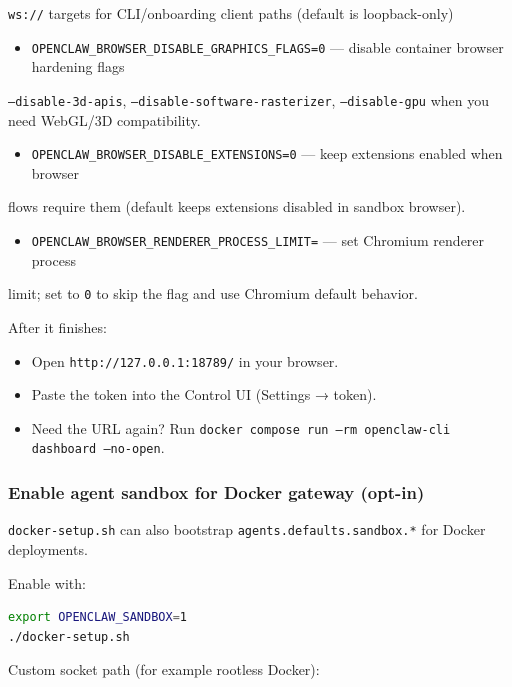 \texttt{ws://} targets for CLI/onboarding client paths (default is loopback-only)
\begin{itemize}
  \item \texttt{OPENCLAW\_BROWSER\_DISABLE\_GRAPHICS\_FLAGS=0} — disable container browser hardening flags
\end{itemize}

\texttt{--disable-3d-apis}, \texttt{--disable-software-rasterizer}, \texttt{--disable-gpu} when you need
WebGL/3D compatibility.
\begin{itemize}
  \item \texttt{OPENCLAW\_BROWSER\_DISABLE\_EXTENSIONS=0} — keep extensions enabled when browser
\end{itemize}

flows require them (default keeps extensions disabled in sandbox browser).
\begin{itemize}
  \item \texttt{OPENCLAW\_BROWSER\_RENDERER\_PROCESS\_LIMIT=} — set Chromium renderer process
\end{itemize}

limit; set to \texttt{0} to skip the flag and use Chromium default behavior.

After it finishes:

\begin{itemize}
  \item Open \texttt{http://127.0.0.1:18789/} in your browser.
  \item Paste the token into the Control UI (Settings → token).
  \item Need the URL again? Run \texttt{docker compose run --rm openclaw-cli dashboard --no-open}.
\end{itemize}


\subsubsection{Enable agent sandbox for Docker gateway (opt-in)}


\texttt{docker-setup.sh} can also bootstrap \texttt{agents.defaults.sandbox.*} for Docker
deployments.

Enable with:

\begin{lstlisting}[language=bash]
export OPENCLAW_SANDBOX=1
./docker-setup.sh
\end{lstlisting}


Custom socket path (for example rootless Docker):

